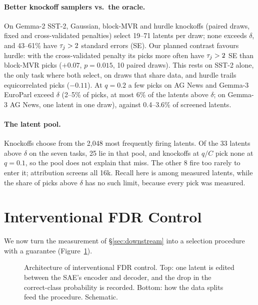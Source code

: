 \paragraph{Better knockoff samplers vs.\ the oracle.} On Gemma-2 SST-2, Gaussian, block-MVR and hurdle knockoffs (paired draws,
fixed and cross-validated penalties) select 19--71 latents per draw; none exceeds $\delta$, and 43--61\% have $\tau_j > 2$ standard errors (SE). Our
planned contrast favours hurdle: with the cross-validated penalty its picks more often have $\tau_j > 2$ SE than block-MVR picks
($+0.07$, $p = 0.015$, 10 paired draws). This rests on SST-2 alone, the only task where both select, on draws that share data, and
hurdle trails equicorrelated picks ($-0.11$). At $q = 0.2$ a few picks on AG News and Gemma-3 EuroParl exceed $\delta$ (2--5\% of
picks, at most 6\% of the latents above $\delta$; on Gemma-3 AG News, one latent in one draw), against 0.4--3.6\% of screened latents.

\paragraph{The latent pool.} Knockoffs choose from the 2,048 most frequently firing latents. Of the 33 latents above $\delta$ on
the seven tasks, 25 lie in that pool, and knockoffs at $q/C$ pick none at $q = 0.1$, so the pool does not explain that miss. The other 8
fire too rarely to enter it; attribution screens all 16k. Recall here is among measured latents, while the share of picks above
$\delta$ has no such limit, because every pick was measured.

\section{Interventional FDR Control}
\label{sec:method}

We now turn the measurement of \S\ref{sec:downstream} into a selection procedure with a guarantee (Figure~\ref{fig:pipeline}).

\begin{figure}[t]
\centering
{}
\caption{Architecture of interventional FDR control. Top: one latent is edited between the SAE's encoder and decoder, and the
drop in the correct-class probability is recorded. Bottom: how the data splits feed the procedure. Schematic.}
\label{fig:pipeline}
\end{figure}

